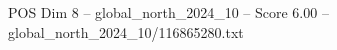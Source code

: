 \begin{textsample}{POS Dim 8 – global\_north\_2024\_10 – Score 6.00 – global\_north\_2024\_10/116865280.txt}
\end{textsample}

